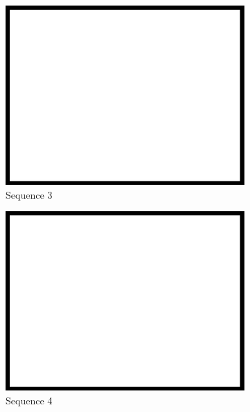 \begin{figure}
\begin{subfigure}{0.49\columnwidth}
    \centering
    \includegraphics[width=1.00\textwidth]{media/dummy.jpg}
    \caption{Sequence 3}
		\label{fig:datasets_3}
  \end{subfigure}
	\begin{subfigure}{0.49\columnwidth}
    \centering
    \includegraphics[width=1.00\textwidth]{media/dummy.jpg}
		\caption{Sequence 4}
		\label{fig:datasets_4}
  \end{subfigure} \vspace{10pt} \\ 
	\begin{subfigure}{0.49\columnwidth}
    \centering

\end{subfigure}
\end{figure}
